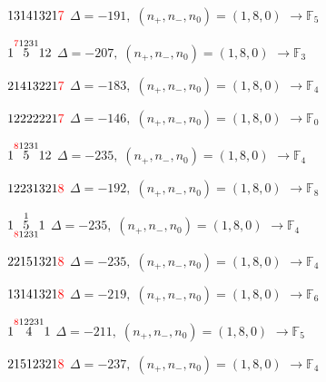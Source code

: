 \documentclass[10pt]{article}
\begin{document}
$13141321\textcolor{red}{7}$ \quad $\Delta=-191,\; (n_+,n_-,n_0)=(1,8,0)$ \quad $\to \mathbb{F}_{5}$

\smallskip

$1\overset{\textcolor{red}{7}1231}{5}12$ \quad $\Delta=-207,\; (n_+,n_-,n_0)=(1,8,0)$ \quad $\to \mathbb{F}_{3}$

\smallskip

$21413221\textcolor{red}{7}$ \quad $\Delta=-183,\; (n_+,n_-,n_0)=(1,8,0)$ \quad $\to \mathbb{F}_{4}$

\smallskip

$12222221\textcolor{red}{7}$ \quad $\Delta=-146,\; (n_+,n_-,n_0)=(1,8,0)$ \quad $\to \mathbb{F}_{0}$

\smallskip

$1\overset{\textcolor{red}{8}1231}{5}12$ \quad $\Delta=-235,\; (n_+,n_-,n_0)=(1,8,0)$ \quad $\to \mathbb{F}_{4}$

\smallskip

$12231321\textcolor{red}{8}$ \quad $\Delta=-192,\; (n_+,n_-,n_0)=(1,8,0)$ \quad $\to \mathbb{F}_{8}$

\smallskip

$1\overset{1}{\underset{\textcolor{red}{8}1231}{5}}1$ \quad $\Delta=-235,\; (n_+,n_-,n_0)=(1,8,0)$ \quad $\to \mathbb{F}_{4}$

\smallskip

$22151321\textcolor{red}{8}$ \quad $\Delta=-235,\; (n_+,n_-,n_0)=(1,8,0)$ \quad $\to \mathbb{F}_{4}$

\smallskip

$13141321\textcolor{red}{8}$ \quad $\Delta=-219,\; (n_+,n_-,n_0)=(1,8,0)$ \quad $\to \mathbb{F}_{6}$

\smallskip

$1\overset{\textcolor{red}{8}12231}{4}1$ \quad $\Delta=-211,\; (n_+,n_-,n_0)=(1,8,0)$ \quad $\to \mathbb{F}_{5}$

\smallskip

$21512321\textcolor{red}{8}$ \quad $\Delta=-237,\; (n_+,n_-,n_0)=(1,8,0)$ \quad $\to \mathbb{F}_{4}$
\end{document}
